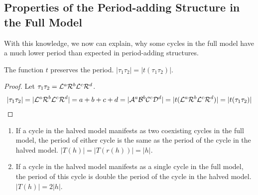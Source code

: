 \subsection{Properties of the Period-adding Structure in the Full Model}

With this knowledge, we now can explain, why some cycles in the full model have a much lower period than expected in period-adding structures.

\begin{lemma}
    \label{lemma:t.preserves.period}
    The function $t$ preserves the period. $|\tau_1\tau_2| = |t(\tau_1\tau_2)|$.
\end{lemma}

\begin{proof}
    Let $\tau_1\tau_2 = \mathcal{L}^a\mathcal{R}^b\mathcal{L}^c\mathcal{R}^d$.
    \begin{align*}
        |\tau_1\tau_2| =  |\mathcal{L}^a\mathcal{R}^b\mathcal{L}^c\mathcal{R}^d|
        = a + b + c + d
        = |\mathcal{A}^a\mathcal{B}^b\mathcal{C}^c\mathcal{D}^d|
        = |t(\mathcal{L}^a\mathcal{R}^b\mathcal{L}^c\mathcal{R}^d)|
        = |t(\tau_1\tau_2)|
    \end{align*}
\end{proof}

\begin{theorem}
    \begin{enumerate}
        \item If a cycle in the halved model manifests as two coexisting cycles in the full model, the period of either cycle is the same as the period of the cycle in the halved model. $|T(h)| = |T(r(h))| = |h|$.
        \item If a cycle in the halved model manifests as a single cycle in the full model, the period of this cycle is double the period of the cycle in the halved model. $|T(h)| = 2 |h|$.
    \end{enumerate}
\end{theorem}


